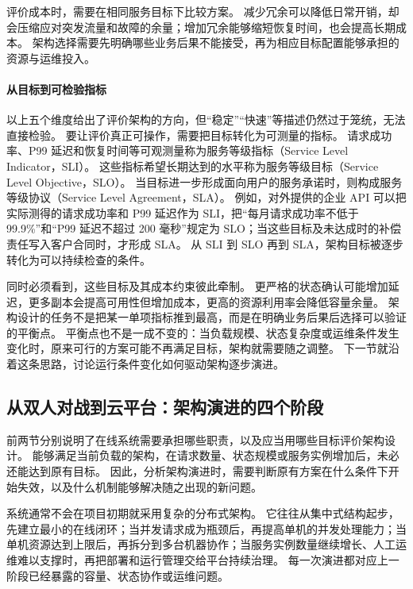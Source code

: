 评价成本时，需要在相同服务目标下比较方案。
减少冗余可以降低日常开销，却会压缩应对突发流量和故障的余量；增加冗余能够缩短恢复时间，也会提高长期成本。
架构选择需要先明确哪些业务后果不能接受，再为相应目标配置能够承担的资源与运维投入。

\paragraph{从目标到可检验指标}

以上五个维度给出了评价架构的方向，但“稳定”“快速”等描述仍然过于笼统，无法直接检验。
要让评价真正可操作，需要把目标转化为可测量的指标。
请求成功率、P99 延迟和恢复时间等可观测量称为服务等级指标（Service Level Indicator，SLI）。
这些指标希望长期达到的水平称为服务等级目标（Service Level Objective，SLO）。
当目标进一步形成面向用户的服务承诺时，则构成服务等级协议（Service Level Agreement，SLA）。
例如，对外提供的企业 API 可以把实际测得的请求成功率和 P99 延迟作为 SLI，把“每月请求成功率不低于 99.9\%”和“P99 延迟不超过 200 毫秒”规定为 SLO；当这些目标及未达成时的补偿责任写入客户合同时，才形成 SLA。
从 SLI 到 SLO 再到 SLA，架构目标被逐步转化为可以持续检查的条件。

同时必须看到，这些目标及其成本约束彼此牵制。
更严格的状态确认可能增加延迟，更多副本会提高可用性但增加成本，更高的资源利用率会降低容量余量。
架构设计的任务不是把某一单项指标推到最高，而是在明确业务后果后选择可以验证的平衡点。
平衡点也不是一成不变的：当负载规模、状态复杂度或运维条件发生变化时，原来可行的方案可能不再满足目标，架构就需要随之调整。
下一节就沿着这条思路，讨论运行条件变化如何驱动架构逐步演进。

\subsection{从双人对战到云平台：架构演进的四个阶段}\label{sec1:architecture-roadmap}

前两节分别说明了在线系统需要承担哪些职责，以及应当用哪些目标评价架构设计。
能够满足当前负载的架构，在请求数量、状态规模或服务实例增加后，未必还能达到原有目标。
因此，分析架构演进时，需要判断原有方案在什么条件下开始失效，以及什么机制能够解决随之出现的新问题。

系统通常不会在项目初期就采用复杂的分布式架构。
它往往从集中式结构起步，先建立最小的在线闭环；当并发请求成为瓶颈后，再提高单机的并发处理能力；当单机资源达到上限后，再拆分到多台机器协作；当服务实例数量继续增长、人工运维难以支撑时，再把部署和运行管理交给平台持续治理。
每一次演进都对应上一阶段已经暴露的容量、状态协作或运维问题。

